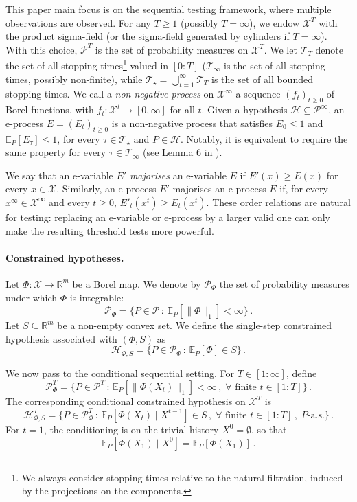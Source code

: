 \documentclass[10pt, a4paper]{article}
\newcommand{\E}{\mathbb E}
\newcommand{\Hh}{\mathcal H}
\newcommand{\HhP}{\Hh_{\Phi,S}}
\newcommand{\PR}{\mathscr{P}}
\newcommand{\R}{\mathbb R}
\newcommand{\T}{\mathcal T}
\newcommand{\X}{\mathcal X}
\begin{document}
This paper main focus is on the sequential testing framework, where multiple observations are observed. For any $T\geq 1$ (possibly $T=\infty$), we endow $\X^T$ with the product sigma-field (or the sigma-field generated by cylinders if $T=\infty$). With this choice, $\PR^T$  is the set of probability measures on $\X^T$. We let $\T_T$ denote the set of all stopping times\footnote{We always consider stopping times  relative to the natural filtration, induced by the projections on the components.} valued in $[0:T]$ ($\T_\infty$ is the set of all stopping times, possibly non-finite), while $\T_\star=\bigcup_{t=1}^\infty\T_T$ is the set of all bounded stopping times. We call a \emph{non-negative process} on $\X^\infty$ a sequence $(f_t)_{t\geq 0}$ of Borel functions, with $f_t:\X^t\to[0,\infty]$ for all $t$. Given a hypothesis $\Hh\subseteq\PR^\infty$, an e-process $E = (E_t)_{t\geq 0}$ is a non-negative process that satisfies $E_0\leq 1$ and  $\E_P[E_\tau]\leq 1$, for every $\tau\in\T_\star$ and $P\in\Hh$. Notably, it is equivalent to require the same property  for every $\tau\in\T_\infty$ (see Lemma 6 in \citealt{ramdas2020admissible}).

We say that an e-variable $E'$ \emph{majorises} an e-variable $E$ if $E'(x)\geq E(x)$ for every $x\in\X$. Similarly, an e-process $E'$ majorises an e-process $E$ if, for every $x^\infty\in\X^\infty$ and every $t\geq 0$, $E'_t(x^t)\geq E_t(x^t)$. These order relations are natural for testing: replacing an e-variable or e-process by a larger valid one can only make the resulting threshold tests more powerful.
\paragraph{Constrained hypotheses.}
Let $\Phi:\X\to\R^m$ be a Borel map. We denote by $\PR_\Phi$ the set of probability measures under which $\Phi$ is integrable:
$$\PR_\Phi = \{P\in\PR\,:\,\E_P[\|\Phi\|_1]<\infty\}\,.$$
Let $S\subseteq\R^m$ be a non-empty convex set. We define the single-step constrained hypothesis associated with $(\Phi,S)$ as
$$\HhP = \{P\in\PR_\Phi\,:\,\E_P[\Phi]\in S\}\,.$$

We now pass to the conditional sequential setting. For $T\in[1:\infty]$, define
$$\PR_\Phi^T = \{P\in\PR^T\,:\,\E_P[\|\Phi(X_t)\|_1]<\infty\,,\;\forall\text{ finite }t\in[1:T] \}\,.$$
The corresponding conditional constrained hypothesis on $\X^T$ is
$$\HhP^T = \{P\in\PR_\Phi^T\,:\,\E_P[\Phi(X_t)\mid X^{t-1}]\in S\,,\;\forall\text{ finite } t\in [1:T]\,,\;P\text{-a.s.}\}\,.$$
For $t=1$, the conditioning is on the trivial history $X^0=\emptyset$, so that
$$\E_P[\Phi(X_1)\mid X^0]=\E_P[\Phi(X_1)]\,.$$
\end{document}
